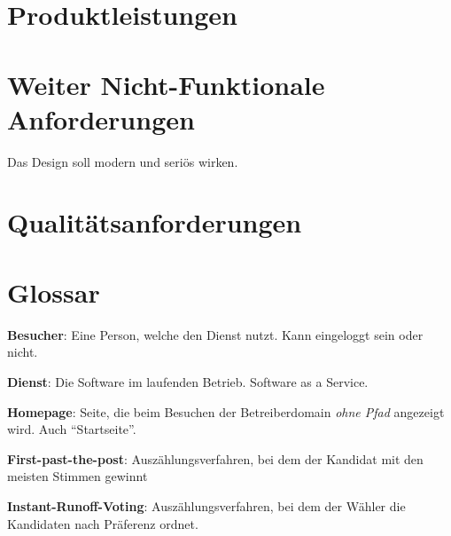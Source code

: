 \documentclass[parskip=full,11pt,twoside]{scrartcl}
\begin{document}
\section{Produktleistungen}


\section{Weiter Nicht-Funktionale Anforderungen}


Das Design soll modern und seriös wirken.


\section{Qualitätsanforderungen}



\section{Glossar}

\textbf{Besucher}:
Eine Person, welche den Dienst nutzt.
Kann eingeloggt sein oder nicht.

\textbf{Dienst}:
Die Software im laufenden Betrieb. Software as a Service.

\textbf{Homepage}:
Seite, die beim Besuchen der Betreiberdomain \emph{ohne Pfad} angezeigt wird. Auch \enquote{Startseite}.

\textbf{First-past-the-post}:
Auszählungsverfahren, bei dem der Kandidat mit den meisten Stimmen gewinnt

\textbf{Instant-Runoff-Voting}:
Auszählungsverfahren, bei dem der Wähler die Kandidaten nach Präferenz ordnet.
\end{document}
